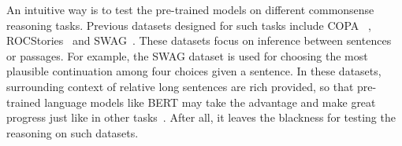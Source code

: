 An intuitive way %
is to test the pre-trained models on different commonsense reasoning tasks.
Previous datasets designed for such tasks include COPA ~\cite{roemmele2011choice}, ROCStories~\cite{mostafazadeh2016corpus} and SWAG~\cite{zellers2018swag}.
These datasets focus on inference between sentences or passages. 
For example, the SWAG dataset is used for choosing the most plausible continuation among four choices given a sentence.
In these datasets, 
surrounding context of relative long sentences are rich provided, %
so that pre-trained language models like BERT may take the advantage and make great progress just like in other tasks~\cite{devlin2018bert}.
After all, 
it leaves the blackness for testing the reasoning on such datasets. 






